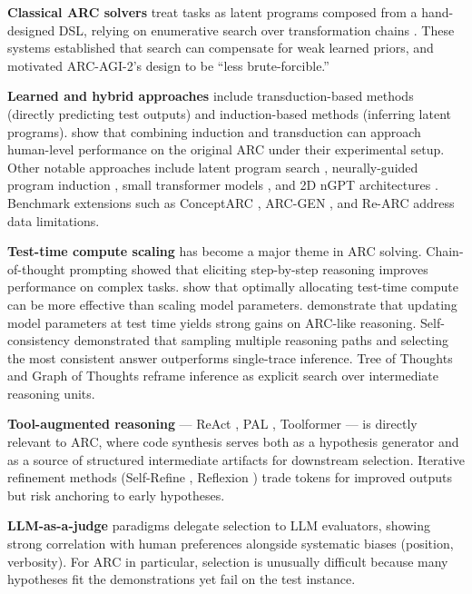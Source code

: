 \documentclass[10pt]{article}
\begin{document}
\textbf{Classical ARC solvers} treat tasks as latent programs composed
from a hand-designed DSL, relying on enumerative search over
transformation chains \citep{ferre2021arc}. These systems established
that search can compensate for weak learned priors, and motivated
ARC-AGI-2's design to be ``less brute-forcible.''

\textbf{Learned and hybrid approaches} include transduction-based
methods (directly predicting test outputs) and induction-based methods
(inferring latent programs). \citet{li2024induction} show that combining
induction and transduction can approach human-level performance on the
original ARC under their experimental setup. Other notable approaches
include latent program search \citep{bonnet2024latent}, neurally-guided
program induction \citep{ouellette2024neurally}, small transformer
models \citep{fletcherhill2024miniarc}, and 2D nGPT architectures
\citep{puget2024nGPT}. Benchmark extensions such as ConceptARC
\citep{moskvichev2023conceptarc}, ARC-GEN \citep{moffitt2025arcgen}, and
Re-ARC \citep{hodel2024rearc} address data limitations.

\textbf{Test-time compute scaling} has become a major theme in ARC
solving. Chain-of-thought prompting \citep{wei2022chain} showed that
eliciting step-by-step reasoning improves performance on complex tasks.
\citet{snell2024scaling} show that optimally allocating test-time
compute can be more effective than scaling model parameters.
\citet{akyurek2024surprising} demonstrate that updating model parameters
at test time yields strong gains on ARC-like reasoning. Self-consistency
\citep{wang2022selfconsistency} demonstrated that sampling multiple
reasoning paths and selecting the most consistent answer outperforms
single-trace inference. Tree of Thoughts \citep{yao2023tree} and Graph
of Thoughts \citep{besta2024graph} reframe inference as explicit search
over intermediate reasoning units.

\textbf{Tool-augmented reasoning} --- ReAct \citep{yao2022react}, PAL
\citep{gao2023pal}, Toolformer \citep{schick2023toolformer} --- is
directly relevant to ARC, where code synthesis serves both as a
hypothesis generator and as a source of structured intermediate
artifacts for downstream selection. Iterative refinement methods
(Self-Refine \citep{madaan2023selfrefine}, Reflexion
\citep{shinn2023reflexion}) trade tokens for improved outputs but risk
anchoring to early hypotheses.

\textbf{LLM-as-a-judge} paradigms \citep{zheng2023judging} delegate
selection to LLM evaluators, showing strong correlation with human
preferences alongside systematic biases (position, verbosity). For ARC
in particular, selection is unusually difficult because many hypotheses
fit the demonstrations yet fail on the test instance.
\end{document}
